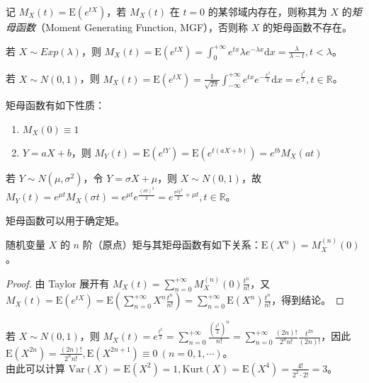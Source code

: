 \documentclass[../main.tex]{subfiles}
\begin{document}
\begin{definition}\label{def:4.6.1}
    记 $M_X(t)=\mathrm E(e^{tX})$，若 $M_X(t)$ 在 $t=0$ 的某邻域内存在，则称其为 $X$ 的\emph{矩母函数}（Moment Generating Function, MGF），否则称 $X$ 的矩母函数不存在。
\end{definition}

\begin{example}
    若 $X\sim Exp(\lambda)$，则 $M_X(t)=\mathrm E(e^{tX})=\int_0^{+\infty}e^{tx}\lambda e^{-\lambda x}\mathrm dx=\frac\lambda{\lambda-t},t<\lambda$。
\end{example}

\begin{example}
    若 $X\sim N(0,1)$，则 $M_X(t)=\mathrm E(e^{tX})=\frac{1}{\sqrt{2\pi}}\int_{-\infty}^{+\infty}e^{tx}e^{-\frac{x^2}2}\mathrm dx=e^{\frac{t^2}2},t\in\mathbb R$。
\end{example}

\begin{proposition}
    矩母函数有如下性质：
    \begin{enumerate}
        \item $M_X(0)\equiv1$
        \item $Y=aX+b$，则 $M_Y(t)=\mathrm E(e^{tY})=\mathrm E(e^{t(aX+b)})=e^{tb}M_X(at)$
    \end{enumerate}
\end{proposition}

\begin{example}
    若 $Y\sim N(\mu,\sigma^2)$，令 $Y=\sigma X+\mu$，则 $X\sim N(0,1)$，故 $M_Y(t)=e^{\mu t}M_X(\sigma t)=e^{\mu t}e^{\frac{(\sigma t)^2}2}=e^{\frac{\sigma^2t^2}2+\mu t},t\in\mathbb R$。
\end{example}

矩母函数可以用于确定矩。

\begin{theorem}\label{thm:4.6.1}
    随机变量 $X$ 的 $n$ 阶（原点）矩与其矩母函数有如下关系：$\mathrm E(X^n)=M_X^{(n)}(0)$。
\end{theorem}

\begin{proof}
    由 Taylor 展开有 $M_X(t)=\sum_{n=0}^{+\infty}M_X^{(n)}(0)\frac{t^n}{n!}$，又 $M_X(t)=\mathrm E(e^{tX})=\mathrm E(\sum_{n=0}^{+\infty}X^n\frac{t^n}{n!})=\sum_{n=0}^{+\infty}\mathrm E(X^n)\frac{t^n}{n!}$，得到结论。
\end{proof}

\begin{example}
    若 $X\sim N(0,1)$，则 $M_X(t)=e^{\frac{t^2}2}=\sum_{n=0}^{+\infty}\frac{(\frac{t^2}2)^n}{n!}=\sum_{n=0}^{+\infty}\frac{(2n)!}{2^nn!}\frac{t^{2n}}{(2n)!}$，因此 $\mathrm E(X^{2n})=\frac{(2n)!}{2^nn!},\mathrm E(X^{2n+1})\equiv0\ (n=0,1,\cdots)$。\\
    由此可以计算 $\mathrm{Var}(X)=\mathrm E(X^2)=1,\mathrm{Kurt}(X)=\mathrm E(X^4)=\frac{4!}{2^2\cdot2!}=3$。
\end{example}
\end{document}
